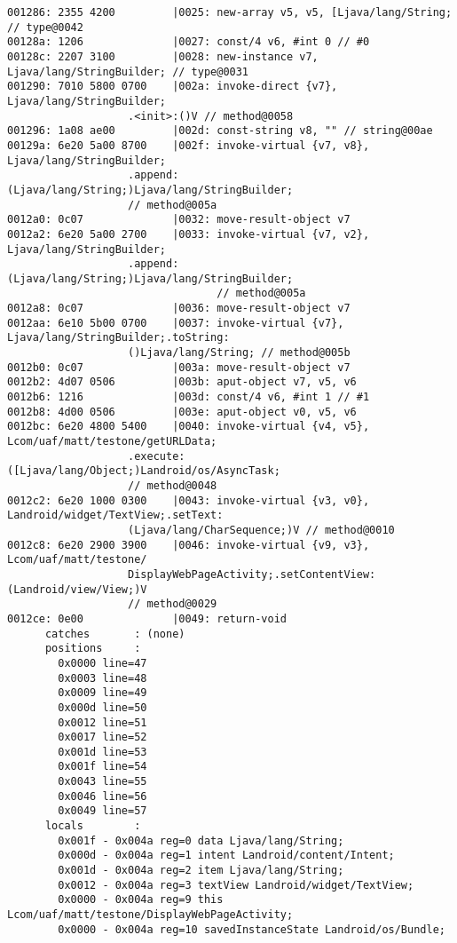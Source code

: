 \begin{lstlisting}
001286: 2355 4200         |0025: new-array v5, v5, [Ljava/lang/String; // type@0042
00128a: 1206              |0027: const/4 v6, #int 0 // #0
00128c: 2207 3100         |0028: new-instance v7, Ljava/lang/StringBuilder; // type@0031
001290: 7010 5800 0700    |002a: invoke-direct {v7}, Ljava/lang/StringBuilder;
				   .<init>:()V // method@0058
001296: 1a08 ae00         |002d: const-string v8, "" // string@00ae
00129a: 6e20 5a00 8700    |002f: invoke-virtual {v7, v8}, Ljava/lang/StringBuilder;
				   .append:(Ljava/lang/String;)Ljava/lang/StringBuilder;
				   // method@005a
0012a0: 0c07              |0032: move-result-object v7
0012a2: 6e20 5a00 2700    |0033: invoke-virtual {v7, v2}, Ljava/lang/StringBuilder;
				   .append:(Ljava/lang/String;)Ljava/lang/StringBuilder;
                                 // method@005a
0012a8: 0c07              |0036: move-result-object v7
0012aa: 6e10 5b00 0700    |0037: invoke-virtual {v7}, Ljava/lang/StringBuilder;.toString:
				   ()Ljava/lang/String; // method@005b
0012b0: 0c07              |003a: move-result-object v7
0012b2: 4d07 0506         |003b: aput-object v7, v5, v6
0012b6: 1216              |003d: const/4 v6, #int 1 // #1
0012b8: 4d00 0506         |003e: aput-object v0, v5, v6
0012bc: 6e20 4800 5400    |0040: invoke-virtual {v4, v5}, Lcom/uaf/matt/testone/getURLData;
				   .execute:([Ljava/lang/Object;)Landroid/os/AsyncTask;
				   // method@0048
0012c2: 6e20 1000 0300    |0043: invoke-virtual {v3, v0}, Landroid/widget/TextView;.setText:
				   (Ljava/lang/CharSequence;)V // method@0010
0012c8: 6e20 2900 3900    |0046: invoke-virtual {v9, v3}, Lcom/uaf/matt/testone/
				   DisplayWebPageActivity;.setContentView:(Landroid/view/View;)V
				   // method@0029
0012ce: 0e00              |0049: return-void
      catches       : (none)
      positions     :
        0x0000 line=47
        0x0003 line=48
        0x0009 line=49
        0x000d line=50
        0x0012 line=51
        0x0017 line=52
        0x001d line=53
        0x001f line=54
        0x0043 line=55
        0x0046 line=56
        0x0049 line=57
      locals        :
        0x001f - 0x004a reg=0 data Ljava/lang/String;
        0x000d - 0x004a reg=1 intent Landroid/content/Intent;
        0x001d - 0x004a reg=2 item Ljava/lang/String;
        0x0012 - 0x004a reg=3 textView Landroid/widget/TextView;
        0x0000 - 0x004a reg=9 this Lcom/uaf/matt/testone/DisplayWebPageActivity;
        0x0000 - 0x004a reg=10 savedInstanceState Landroid/os/Bundle;


\end{lstlisting}
